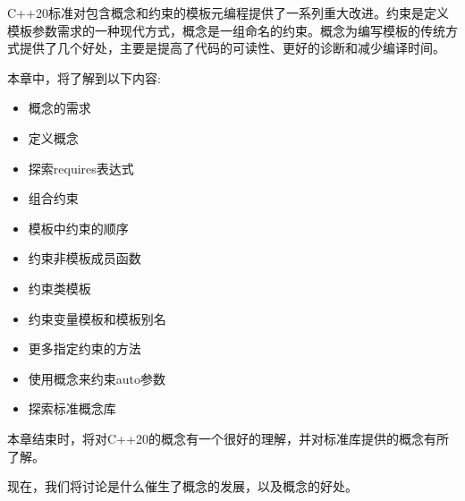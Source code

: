 C++20标准对包含概念和约束的模板元编程提供了一系列重大改进。约束是定义模板参数需求的一种现代方式，概念是一组命名的约束。概念为编写模板的传统方式提供了几个好处，主要是提高了代码的可读性、更好的诊断和减少编译时间。

本章中，将了解到以下内容:

\begin{itemize}
\item
概念的需求

\item
定义概念

\item
探索requires表达式

\item
组合约束

\item
模板中约束的顺序

\item
约束非模板成员函数

\item
约束类模板

\item
约束变量模板和模板别名

\item
更多指定约束的方法

\item
使用概念来约束auto参数

\item
探索标准概念库
\end{itemize}

本章结束时，将对C++20的概念有一个很好的理解，并对标准库提供的概念有所了解。

现在，我们将讨论是什么催生了概念的发展，以及概念的好处。



























